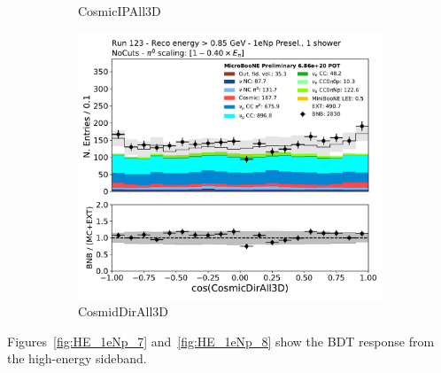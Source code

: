 \begin{figure}[H]
\begin{subfigure}{0.3\textwidth}
    \caption{CosmicIPAll3D}
    \end{subfigure}
    \begin{subfigure}{0.3\textwidth}
    \includegraphics[width=1.0\textwidth]{Sidebands/Figures/1eNp/HighEnergy/HiEext_NPOneShr_None_pi0e040/CosmicDirAll3D.pdf}
    \caption{CosmidDirAll3D}
    \end{subfigure}
    \caption{} 
    \label{fig:HE_1eNp_5}
\end{figure}

Figures~\ref{fig:HE_1eNp_7} and~\ref{fig:HE_1eNp_8} show the BDT response from the \npsel high-energy sideband.

